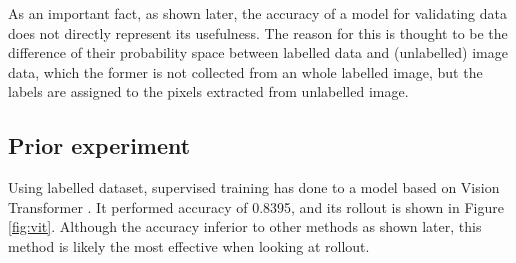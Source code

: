 \documentclass{article}
\begin{document}
        As an important fact, as shown later,
        the accuracy of a model for validating data does not
        directly represent its usefulness.
        The reason for this is thought to be the difference of their
        probability space between labelled data and (unlabelled) image data,
        which the former is not collected from an whole labelled image,
        but the labels are assigned to the pixels extracted from unlabelled image.

    \subsection{Prior experiment} \label{sec:vit}
        Using labelled dataset,
        supervised training has done to a model based on Vision Transformer \cite{vit}.
        It performed accuracy of 0.8395, and its rollout is shown in Figure \ref{fig:vit}.
        Although the accuracy inferior to other methods as shown later,
        this method is likely the most effective when looking at rollout.
\end{document}
